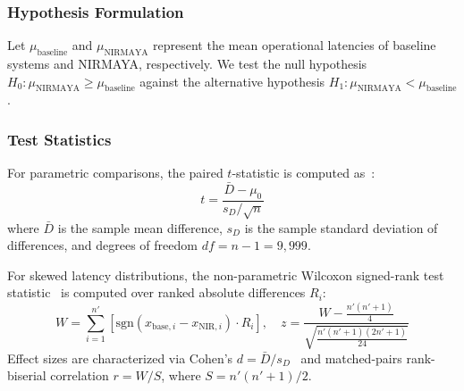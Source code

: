 \documentclass[journal,twocolumn]{IEEEtran}
\begin{document}
\subsubsection{Hypothesis Formulation}
Let $\mu_{\text{baseline}}$ and $\mu_{\text{NIRMAYA}}$ represent the mean operational latencies of baseline systems and NIRMAYA, respectively. We test the null hypothesis $H_0: \mu_{\text{NIRMAYA}} \ge \mu_{\text{baseline}}$ against the alternative hypothesis $H_1: \mu_{\text{NIRMAYA}} < \mu_{\text{baseline}}$.

\subsubsection{Test Statistics}
For parametric comparisons, the paired $t$-statistic is computed as~\cite{student_1908}:
\begin{equation}
    \label{eq:ttest}
    t = \frac{\bar{D} - \mu_0}{s_D / \sqrt{n}}
\end{equation}
where $\bar{D}$ is the sample mean difference, $s_D$ is the sample standard deviation of differences, and degrees of freedom $df = n - 1 = 9,999$.

For skewed latency distributions, the non-parametric Wilcoxon signed-rank test statistic~\cite{wilcoxon_1945} is computed over ranked absolute differences $R_i$:
\begin{equation}
    \label{eq:wilcoxon}
    W = \sum_{i=1}^{n'} \left[ \text{sgn}(x_{\text{base},i} - x_{\text{NIR},i}) \cdot R_i \right], \quad z = \frac{W - \frac{n'(n'+1)}{4}}{\sqrt{\frac{n'(n'+1)(2n'+1)}{24}}}
\end{equation}
Effect sizes are characterized via Cohen's $d = \bar{D} / s_D$~\cite{cohen_1988} and matched-pairs rank-biserial correlation $r = W / S$, where $S = n'(n'+1)/2$.
\end{document}
